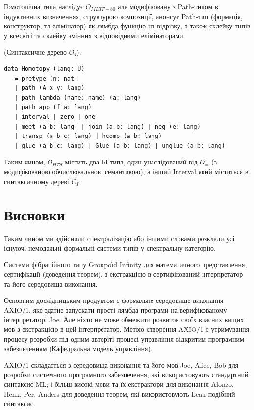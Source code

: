 Гомотопічна типа наслідує $O_{MLTT-80}$ але модифіковану з
Path-типом в індуктивних визначеннях, структурою композиції,
анонсує Path-тип (формація, конструктор, та елімінатор)
як лямбда функцію на відрізку, а також склейку типів у всесвіті
та склейку змінних з відповідними елімінаторами.

\begin{definition} (Синтаксичне дерево $O_I$).
\begin{lstlisting}
data Homotopy (lang: U)
   = pretype (n: nat)
   | path (A x y: lang)
   | path_lambda (name: name) (a: lang)
   | path_app (f a: lang)
   | interval | zero | one
   | meet (a b: lang) | join (a b: lang) | neg (e: lang)
   | transp (a b c: lang) | hcomp (a b: lang)
   | glue (a b c: lang) | Glue (a b: lang) | unglue (a b: lang)
\end{lstlisting}
\end{definition}

Таким чином,
$O_{HTS}$ містить два Id-типа, один унаслідований від $O_=$ (з модифікованою
обчислювальною семантикою), а інший Interval який міститься в синтаксичному дереві $O_I$.

\newpage
\section{Висновки}

Таким чином ми здійснили спектралізацію або іншими словами розклали усі
існуючі немодальні формальні системи типів у спектральну категорію.

Системи фібраційного типу Groupoїd Infinity для математичного представлення,
сертифікації (доведення теорем), з екстракцією в сертифікований інтерпретатор
та його середовища виконання.

Основним дослідницьким продуктом є формальне середовище виконання AXIO/1,
яке здатне запускати прості лямбда-програми на верифікованому інтерпретаторі Joe.
Але ніхто не може обмежити розвиток своїх власних вищих мов з екстракцією в цей інтерпретатор.
Метою створення AXIO/1 є утримування процесу розробки під одним авторіті процесі управління
відкритим програмним забезпеченням (Кафедральна модель управління).

AXIO/1 складається з середовища виконання та його мов Joe, Alice, Bob для розробки системного
програмного забезпечення, які використовують стандартний синтаксис ML; і більш високі
мови та їх екстрактори для виконання Alonzo, Henk, Per, Anders для доведення теорем,
які використовують Lean-подібний синтаксис.

